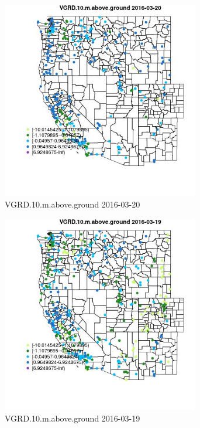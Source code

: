 \begin{figure} 
\centering  
\includegraphics[width=0.77\textwidth]{Code_Outputs/Report_ML_input_PM25_Step4_part_e_de_duplicated_aveswNAs_MapObsVGRD10maboveground2016-03-20.jpg} 
\caption{\label{fig:Report_ML_input_PM25_Step4_part_e_de_duplicated_aveswNAsMapObsVGRD10maboveground2016-03-20}VGRD.10.m.above.ground 2016-03-20} 
\end{figure} 
 

\begin{figure} 
\centering  
\includegraphics[width=0.77\textwidth]{Code_Outputs/Report_ML_input_PM25_Step4_part_e_de_duplicated_aveswNAs_MapObsVGRD10maboveground2016-03-19.jpg} 
\caption{\label{fig:Report_ML_input_PM25_Step4_part_e_de_duplicated_aveswNAsMapObsVGRD10maboveground2016-03-19}VGRD.10.m.above.ground 2016-03-19} 
\end{figure} 
 

